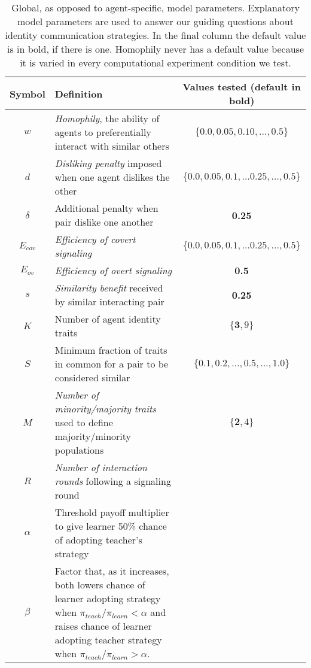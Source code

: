 \documentclass[11pt,letterpaper]{article}
\begin{document}
\vspace{1em}
\begin{table}[H]
  \centering
  \begin{tabular}{cp{3.5in}c}
    Symbol & Definition & Values tested (default in bold)  \\
    \toprule 
    $w$      & \emph{Homophily}, the ability of agents to preferentially interact with similar others & $\{0.0, 0.05, 0.10, \ldots, 0.5\}$ \\
    $d$      & \emph{Disliking penalty} imposed when one agent dislikes the other & $\{0.0, 0.05, 0.1,\ldots \mathbf{0.25}, \ldots, 0.5\}$ \\
    $\delta$ & Additional penalty when pair dislike one another & \textbf{0.25} \\
    $E_{cov}$ & \emph{Efficiency of covert signaling} & $\{0.0, 0.05, 0.1,\ldots \mathbf{0.25}, \ldots, 0.5\}$ \\
    $E_{ov}$ & \emph{Efficiency of overt signaling} & \textbf{0.5} \\
    $s$      & \emph{Similarity benefit} received by similar interacting pair & \textbf{0.25} \\
    $K$      & Number of agent identity traits & $\{\mathbf{3}, 9\}$ \\
    $S$      & Minimum fraction of traits in common for a pair to be considered similar & 
      $\{0.1, 0.2, \ldots, \mathbf{0.5}, \ldots, 1.0\}$\\
    $M$      & \emph{Number of minority/majority traits} used to define majority/minority populations & $\{\mathbf{2}, 4\}$\\
    $R$      & \emph{Number of interaction rounds} following a signaling round \\
    $\alpha$ & Threshold payoff multiplier to give learner 50\% chance of 
               adopting teacher's strategy \\
    $\beta$  & Factor that, as it increases, both lowers chance of learner 
               adopting strategy when $\pi_{teach}/\pi_{learn} < \alpha$ and
               raises chance of learner adopting teacher strategy when 
               $\pi_{teach}/\pi_{learn} > \alpha$.
  \end{tabular}
  \caption{Global, as opposed to agent-specific, model parameters. 
  Explanatory model parameters are used to answer
  our guiding questions about identity communication strategies. In the final
  column the default value is in bold, if there is one. Homophily never has a
  default value because it is varied in every computational experiment
  condition we test.}
  \label{tab:params}
\end{table}
\end{document}
